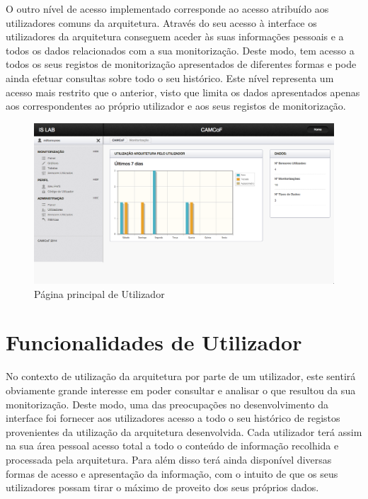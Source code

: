 O outro nível de acesso implementado corresponde ao acesso atribuído aos utilizadores comuns da arquitetura. Através do seu acesso à interface os utilizadores da arquitetura conseguem aceder às suas informações pessoais e a todos os dados relacionados com a sua monitorização. Deste modo, tem acesso a todos os seus registos de monitorização apresentados de diferentes formas e pode ainda efetuar consultas sobre todo o seu histórico. Este nível representa um acesso mais restrito que o anterior, visto que limita os dados apresentados apenas aos correspondentes ao próprio utilizador e aos seus registos de monitorização.

 \begin{figure}[htb]
   \centering
   \includegraphics[scale=0.29]{Images/home.png}
   \caption{Página principal de Utilizador}
\end{figure}

\section{Funcionalidades de Utilizador}

No contexto de utilização da arquitetura por parte de um utilizador, este sentirá obviamente grande interesse em poder consultar e analisar o que resultou da sua monitorização. Deste modo, uma das preocupações no desenvolvimento da interface foi fornecer aos utilizadores acesso a todo o seu histórico de registos provenientes da utilização da arquitetura desenvolvida. Cada utilizador terá assim na sua área pessoal acesso total a todo o conteúdo de informação recolhida e processada pela arquitetura. Para além disso terá ainda disponível diversas formas de acesso e apresentação da informação, com o intuito de que os seus utilizadores possam tirar o máximo de proveito dos seus próprios dados.

